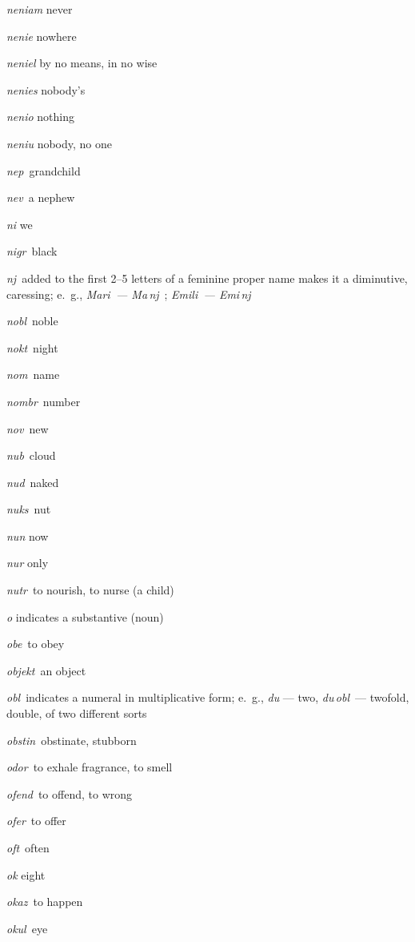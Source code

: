 \begin{landscape}
\begin{multicols}{5}
\begin{outdent}{1em}
\emph{neniam} never

\emph{nenie} nowhere

\emph{neniel} by no means, in no wise

\emph{nenies} nobody’s

\emph{nenio} nothing

\emph{neniu} nobody, no one

\emph{nep\,} grandchild

\emph{nev\,} a nephew

\emph{ni} we

\emph{nigr\,} black

\emph{nj\,} added to the first 2--5 letters of a feminine proper name makes it a diminutive, caressing; e.~g., \emph{Mari\, — Ma\,nj\,} ; \emph{Emili\, — Emi\,nj\,} 

\emph{nobl\,} noble

\emph{nokt\,} night

\emph{nom\,} name

\emph{nombr\,} number

\emph{nov\,} new

\emph{nub\,} cloud

\emph{nud\,} naked

\emph{nuks\,} nut

\emph{nun} now

\emph{nur} only

\emph{nutr\,} to nourish, to nurse (a child)
\end{outdent}


\begin{outdent}{1em}
\emph{o} indicates a substantive (noun)

\emph{obe\,} to obey

\emph{objekt\,} an object

\emph{obl\,} indicates a numeral in multiplicative form; e.~g., \emph{du} — two, \emph{du\,obl\,} — twofold, double, of two different sorts

\emph{obstin\,} obstinate, stubborn

\emph{odor\,} to exhale fragrance, to smell

\emph{ofend\,} to offend, to wrong

\emph{ofer\,} to offer

\emph{oft\,} often

\emph{ok} eight

\emph{okaz\,} to happen

\emph{okul\,} eye


\end{outdent}
\end{multicols}
\end{landscape}
